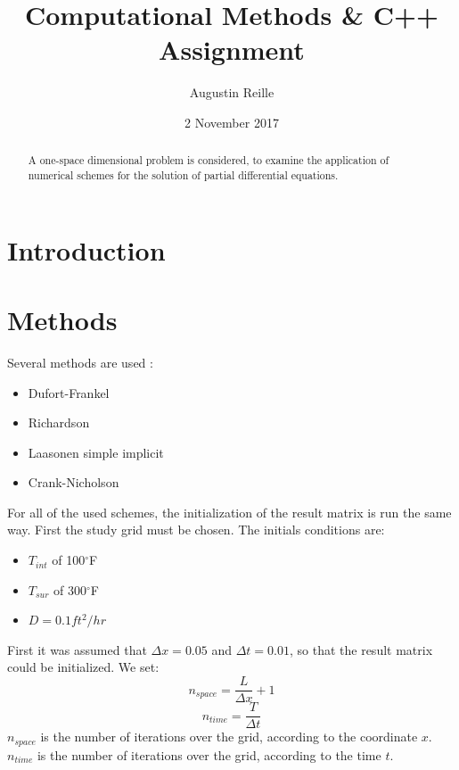 \documentclass{article}
\title{Computational Methods \& C++ Assignment}
\author{Augustin Reille}
\date{2 November 2017}
\begin{document}
    \maketitle

    \tableofcontents

    \listoffigures



    \begin{abstract}
        A one-space dimensional problem is considered, to examine the application
        of numerical schemes for the solution of partial differential equations. 
    \end{abstract}

    \section{Introduction}

    
    \newpage
    \section{Methods}


        Several methods are used :
        \begin{itemize}
            \item{Dufort-Frankel}
            \item{Richardson}
            \item{Laasonen simple implicit}
            \item{Crank-Nicholson}
        \end{itemize}
        For all of the used schemes, the initialization of the result matrix is run the same way.
        First the study grid must be chosen. The initials conditions are:
        \begin{itemize}
            \item{$T_{int}$ of 100$^{\circ}$F}
            \item{$T_{sur}$ of 300$^{\circ}$F}
            \item{$D = 0.1 ft^{2}/hr$}
        \end{itemize}
        First it was assumed that $\Delta x = 0.05$ and $\Delta t = 0.01$,
        so that the result matrix could be initialized.
        We set:
        \begin{equation}
            n_{space} = \frac{L}{\Delta x} + 1
        \end{equation}
        \begin{equation}
            n_{time} = \frac{T}{\Delta t}
        \end{equation}
        $n_{space}$ is the number of iterations over the grid, according to the coordinate $x$. \\
        $n_{time}$ is the number of iterations over the grid, according to the time $t$. \\
        
\end{document}
